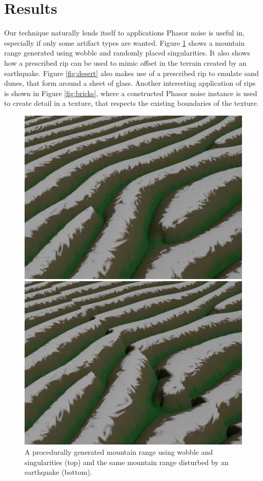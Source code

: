 \documentclass{utue} %
\begin{document}
\section{Results}\label{sec:results}
Our technique naturally lends itself to applications Phasor noise is useful in, especially if only some artifact types are wanted. Figure \ref{fig:mountains} shows a mountain range generated using wobble and randomly placed singularities. It also shows how a prescribed rip can be used to mimic offset in the terrain created by an earthquake. Figure \ref{fig:desert} also makes use of a prescribed rip to emulate sand dunes, that form around a sheet of glass. Another interesting application of rips is shown in Figure \ref{fig:bricks}, where a constructed Phasor noise instance is used to create detail in a texture, that respects the existing boundaries of the texture.

\begin{figure}[ht]
  \centering
  \includegraphics[width=\linewidth]{images/mountains}

  \vspace{2pt}
  
  \includegraphics[width=\linewidth]{images/mountainsRip}
  \caption{A procedurally generated mountain range using wobble and singularities (top) and the same mountain range disturbed by an earthquake (bottom).}\label{fig:mountains}
\end{figure}
\end{document}
